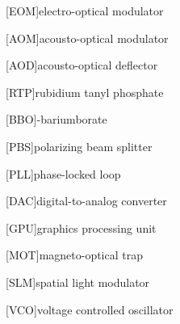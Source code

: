 [EOM]{electro-optical modulator}

[AOM]{acousto-optical modulator}

[AOD]{acousto-optical deflector}

[RTP]{rubidium tanyl phosphate}

[BBO]{\textbeta-bariumborate}

[PBS]{polarizing beam splitter}

[PLL]{phase-locked loop}

[DAC]{digital-to-analog converter}

[GPU]{graphics processing unit}

[MOT]{magneto-optical trap}

[SLM]{spatial light modulator}

[VCO]{voltage controlled oscillator}
